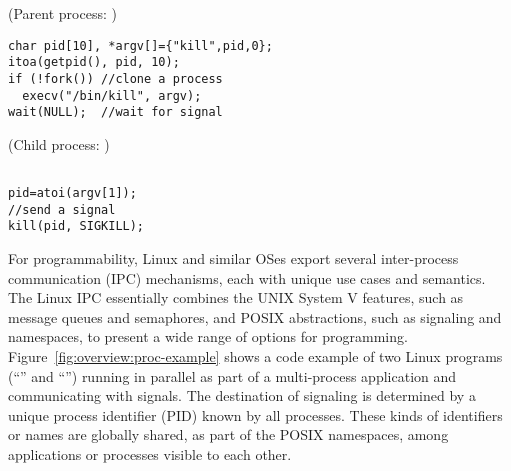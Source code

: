 \begin{figure*}
\begin{minipage}[t]{.65\textwidth}
(Parent process: )
\lstset{basicstyle=\ttfamily\footnotesize,fontadjust=true,breaklines=true}
\begin{lstlisting}
char pid[10], *argv[]={"kill",pid,0};
itoa(getpid(), pid, 10);
if (!fork()) //clone a process
  execv("/bin/kill", argv);
wait(NULL);  //wait for signal
\end{lstlisting}
\end{minipage}
\begin{minipage}[t]{.33\textwidth}
(Child process: )
\lstset{basicstyle=\ttfamily\footnotesize,fontadjust=true,breaklines=true}
\begin{lstlisting}

pid=atoi(argv[1]);
//send a signal
kill(pid, SIGKILL);

\end{lstlisting}
\end{minipage}
\caption{Sample code for Linux applications using process cloning and inter-process communication (IPC).}
\label{fig:overview:proc-example}
\end{figure*}

For programmability, Linux and similar OSes export several inter-process communication (IPC) mechanisms,
each with unique use cases and semantics.
The Linux IPC essentially combines the UNIX System V features, such as message queues and semaphores,
and POSIX abstractions, such as signaling and namespaces,
to present a wide range of options for programming.
Figure~\ref{fig:overview:proc-example} shows a code example of
two Linux programs (``'' and ``'')
running in parallel as part of a multi-process application and communicating with signals.
The destination of signaling is determined by a unique process identifier (PID)
known by all processes.
These kinds of identifiers or names are globally shared, as part of the POSIX namespaces,
among applications or processes visible to each other.




